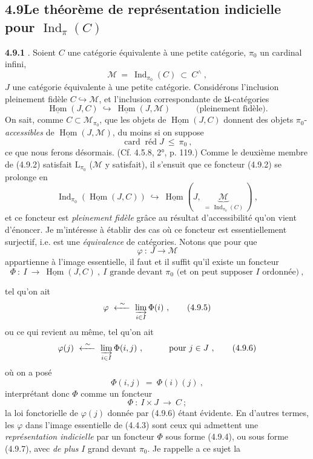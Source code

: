 \documentclass[11pt]{article}
\newcommand{\printedpage}[1]{\marginpar{\footnotesize p.~#1}}
\newcommand{\msp}[1]{\marginpar{\footnotesize [#1]}}
\newcommand{\card}{\operatorname{card}}
\newcommand{\Ind}{\operatorname{Ind}}
\newcommand{\red}{\operatorname{\text{réd}}}
\newcommand{\uHom}{\underline{\operatorname{Hom}}}
\newcommand{\cM}{\mathcal{M}}
\begin{document}
\msp{page 217}

\subsection*{4.9\quad Le théorème de représentation indicielle pour $\Ind_{\pi}(C)$}

\textbf{4.9.1} . Soient $C$ une catégorie équivalente à une petite catégorie, $\pi_0$ un cardinal infini,
\[
\cM \ = \ \Ind_{\pi_0}(C) \ \subset\ C^{\wedge}\ , \tag*{(4.9.1)}
\]
$J$ une catégorie équivalente à une petite catégorie. Considérons l'inclusion pleinement fidèle $C \hookrightarrow \cM$, et l'inclusion correspondante de $\mathfrak{U}$-catégories
\[
\uHom(J, C) \ \hookrightarrow\ \uHom(J, \cM) \qquad\quad \text{(pleinement fidèle).} \tag*{(4.9.2)}
\]
On sait, comme $C \subset \cM_{\pi_0}$, que les objets de $\uHom(J, C)$ donnent des objets $\pi_0$-\textit{accessibles} de $\uHom(J, \cM)$, du moins si on suppose
\[
\card\red J \ \leqslant\ \pi_0\ , \tag*{(4.9.3)}
\]
ce que nous ferons désormais. (Cf. 4.5.8, 2°, p. 119.) Comme le deuxième membre de (4.9.2) satisfait $\mathrm{L}_{\pi_0}$ ($\cM$ y satisfait), il s'ensuit que ce foncteur (4.9.2) se prolonge en
\[
\Ind_{\pi_0}(\uHom(J, C)) \ \hookrightarrow\ \uHom(J,\ \underbrace{\cM}_{=\,\Ind_{\pi_0}(C)}\ )\ , \tag*{(4.9.3)}
\]
\printedpage{78}
et ce foncteur est \textit{pleinement fidèle} grâce au résultat d'accessibilité qu'on vient d'énoncer. Je m'intéresse à établir des cas où ce foncteur est essentiellement surjectif, i.e. est une \textit{équivalence} de catégories. Notons que pour que
\[
\varphi \ :\ J \longrightarrow \cM
\]
appartienne à l'image essentielle, il faut et il suffit qu'il existe un foncteur
\[
\Phi \ :\ I \ \longrightarrow\ \uHom(J, C)\ ,\ I \text{ grande devant } \pi_0 \text{ (et on peut supposer } I \text{ ordonnée)}\ , \tag*{(4.9.4)}
\]

\msp{page 218}

tel qu'on ait
\[
\varphi \ \xleftarrow{\ \sim\ }\ \varinjlim_{i\in I} \Phi(i)\ , \tag*{(4.9.5)}
\]
ou ce qui revient au même, tel qu'on ait
\[
\varphi(j) \ \xleftarrow{\ \sim\ }\ \varinjlim_{i\in I} \Phi(i, j)\ , \qquad\quad \text{pour } j \in J\ , \tag*{(4.9.6)}
\]
où on a posé
\[
\Phi(i, j) \ = \ \Phi(i)(j)\ ,
\]
interprétant donc $\Phi$ comme un foncteur
\[
\Phi \ :\ I \times J \ \longrightarrow\ C\ ; \tag*{(4.9.7)}
\]
la loi fonctorielle de $\varphi(j)$ donnée par (4.9.6) étant évidente. En d'autres termes, les $\varphi$ dans l'image essentielle de (4.4.3) sont ceux qui admettent une \textit{représentation indicielle} par un foncteur $\Phi$ sous forme (4.9.4), ou sous forme (4.9.7), avec \textit{de plus} $I$ grand devant $\pi_0$. Je rappelle a ce sujet la %
\end{document}
